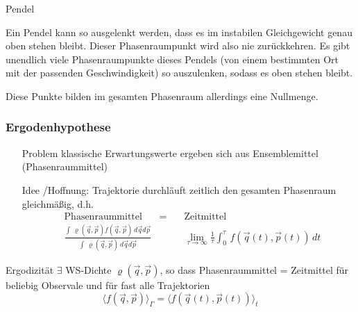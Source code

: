 \begin{beispiel}{Pendel}
        \begin{center}
    \end{center}

Ein Pendel kann so ausgelenkt werden, dass es im instabilen Gleichgewicht genau oben stehen bleibt. Dieser Phasenraumpunkt wird also nie zurückkehren. Es gibt unendlich viele Phasenraumpunkte dieses Pendels (von einem bestimmten Ort mit der passenden Geschwindigkeit) so auszulenken, sodass es oben stehen bleibt.

Diese Punkte bilden im gesamten Phasenraum allerdings eine Nullmenge.
\end{beispiel}



\subsubsection{Ergodenhypothese} 
\begin{itemize}
    \item[Problem] klassische Erwartungswerte ergeben sich aus Ensemblemittel (Phasenraummittel)
    \item[Idee]/Hoffnung: Trajektorie durchläuft zeitlich den gesamten Phasenraum gleichmäßig, d.h.
    \begin{align}
        &\text{Phasenraummittel} &= \quad &\text{Zeitmittel} \\
        &\frac{\int \, \varrho(\Vec{q},\Vec{p}) f(\Vec{q},\Vec{p}) \, d\Vec{q}d\Vec{p}}{\int \, \varrho(\Vec{q},\Vec{p}) \, d\Vec{q}d\Vec{p}} & &\lim_{\tau \to \infty} \frac{1}{\tau} \int_0^{\tau} \, f(\Vec{q}(t),\Vec{p}(t)) \, dt
    \end{align}
\end{itemize}
\begin{definition}{Ergodizität}
    $\exists$ WS-Dichte $\varrho(\Vec{q},\Vec{p})$, so dass Phasenraummittel = Zeitmittel für beliebig Observale und für fast alle Trajektorien
    \begin{equation}
        \langle f(\Vec{q},\Vec{p}) \rangle_{\Gamma} = \langle f(\Vec{q}(t),\Vec{p}(t)) \rangle_t
    \end{equation}
\end{definition}

